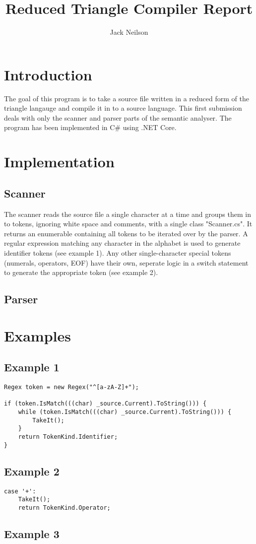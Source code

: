 \documentclass{article}
\begin{document}
\title{Reduced Triangle Compiler Report}
\author{Jack Neilson}
\maketitle
\newpage
\section{Introduction}
The goal of this program is to take a source file written in a reduced form of the triangle langauge and compile it in to a source language. This first submission deals with only the scanner and parser parts of the semantic analyser. The program has been implemented in C\# using .NET Core.

\section{Implementation}
\subsection{Scanner}
The scanner reads the source file a single character at a time and groups them in to tokens, ignoring white space and comments, with a single class "Scanner.cs". It returns an enumerable containing all tokens to be iterated over by the parser. A regular expression matching any character in the alphabet is used to generate identifier tokens (see example 1). Any other single-character special tokens (numerals, operators, EOF) have their own, seperate logic in a switch statement to generate the appropriate token (see example 2).

\subsection{Parser}


\section{Examples}
\subsection{Example 1}
\begin{lstlisting}
Regex token = new Regex("^[a-zA-Z]+");

if (token.IsMatch(((char) _source.Current).ToString())) {
	while (token.IsMatch(((char) _source.Current).ToString())) {
		TakeIt();
    }
	return TokenKind.Identifier;
}
\end{lstlisting}

\subsection{Example 2}
\begin{lstlisting}
case '+':
	TakeIt();
	return TokenKind.Operator;
\end{lstlisting}

\subsection{Example 3}
\begin{lstlisting}
\end{lstlisting}
\end{document}

